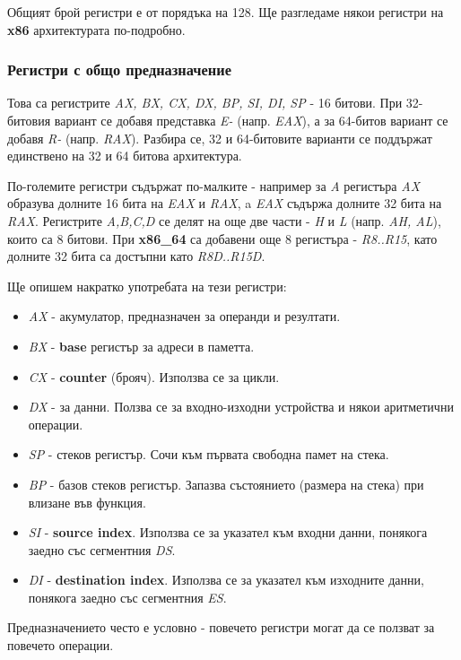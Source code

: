 \documentclass[fleqn,12pt]{article}
\begin{document}
Общият брой регистри е от порядъка на 128. Ще разгледаме някои регистри на \textbf{x86} архитектурата по-подробно.

\subsubsection{Регистри с общо предназначение}
Това са регистрите \textit{AX, BX, CX, DX, BP, SI, DI, SP} - 16 битови. При 32-битовия вариант се добавя представка \textit{E-} (напр. \textit{EAX}),
а за 64-битов вариант се добавя \textit{R-} (напр. \textit{RAX}). Разбира се, 32 и 64-битовите варианти се поддържат единствено на 32 и 64 битова архитектура.

По-големите регистри съдържат по-малките - например за \textit{A} регистъра \textit{AX} образува долните 16 бита на \textit{EAX} и \textit{RAX},
a \textit{EAX} съдържа долните 32 бита на \textit{RAX}. 
Регистрите \textit{A,B,C,D} се делят на още две части - \textit{H} и \textit{L} (напр. \textit{AH, AL}), които са 8 битови. 
При \textbf{x86\_64} са добавени още 8 регистъра - \textit{R8..R15}, като долните 32 бита са достъпни като \textit{R8D..R15D}.

Ще опишем накратко употребата на тези регистри:
\begin{itemize}
    \item \textit{AX} - акумулатор, предназначен за операнди и резултати.
    \item \textit{BX} - \textbf{base} регистър за адреси в паметта.
    \item \textit{CX} - \textbf{counter} (брояч). Използва се за цикли.
    \item \textit{DX} - за данни. Ползва се за входно-изходни устройства и някои аритметични операции.
    \item \textit{SP} - стеков регистър. Сочи към първата свободна памет на стека.
    \item \textit{BP} - базов стеков регистър. Запазва състоянието (размера на стека) при влизане във функция.
    \item \textit{SI} - \textbf{source index}. Използва се за указател към входни данни, понякога заедно със сегментния \textit{DS}.
    \item \textit{DI} - \textbf{destination index}. Използва се за указател към изходните данни, понякога заедно със сегментния \textit{ES}.
\end{itemize}

Предназначението често е условно - повечето регистри могат да се ползват за повечето операции.
\end{document}
